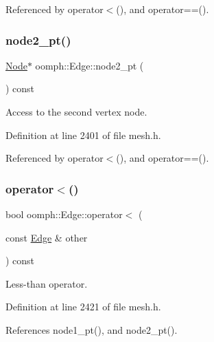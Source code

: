 Referenced by operator$<$(), and operator==().

\mbox{\label{classoomph_1_1Edge_a21b3429f05d157fcc266e4c115757289}} 
\subsubsection{\texorpdfstring{node2\+\_\+pt()}{node2\_pt()}}
{\footnotesize\ttfamily \hyperlink{classoomph_1_1Node}{Node}$\ast$ oomph\+::\+Edge\+::node2\+\_\+pt (\begin{DoxyParamCaption}{ }\end{DoxyParamCaption}) const\hspace{0.3cm}{\ttfamily [inline]}}



Access to the second vertex node. 



Definition at line 2401 of file mesh.\+h.



Referenced by operator$<$(), and operator==().

\mbox{\label{classoomph_1_1Edge_ad582b8c145bb83d32547e80adb199dc0}} 
\subsubsection{\texorpdfstring{operator$<$()}{operator<()}}
{\footnotesize\ttfamily bool oomph\+::\+Edge\+::operator$<$ (\begin{DoxyParamCaption}\item[{const \hyperlink{classoomph_1_1Edge}{Edge} \&}]{other }\end{DoxyParamCaption}) const\hspace{0.3cm}{\ttfamily [inline]}}



Less-\/than operator. 



Definition at line 2421 of file mesh.\+h.



References node1\+\_\+pt(), and node2\+\_\+pt().

\mbox{\label{classoomph_1_1Edge_afc64c614a15316a3ee55a0c3a27cb0bf}} 
